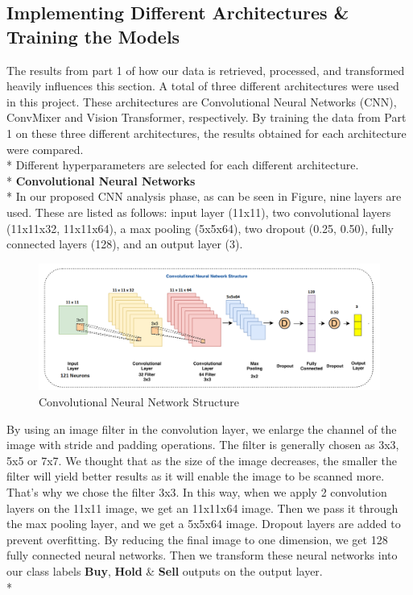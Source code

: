 \documentclass{article}
\begin{document}
\subsection{Implementing Different Architectures \& Training the Models}
The results from part 1 of how our data is retrieved, processed, and transformed heavily influences this section. A total of three different architectures were used in this project. These architectures are Convolutional Neural Networks (CNN), ConvMixer and Vision Transformer, respectively. By training the data from Part 1 on these three different architectures, the results obtained for each architecture were compared.\vspace{0.1cm} \\*
Different hyperparameters are selected for each different architecture.\vspace{0.3cm} \\*
\textbf{\large Convolutional Neural Networks} \\*
In our proposed CNN analysis phase, as can be seen in Figure, nine layers are used. These are listed as follows: input layer (11x11), two convolutional layers (11x11x32, 11x11x64), a max pooling (5x5x64), two dropout (0.25, 0.50), fully connected layers (128), and an output layer (3).
\begin{figure}[H]
\begin{center}
   \includegraphics[scale=0.24]{Assets/cnn_structure.png}
   \caption{Convolutional Neural Network Structure}
\end{center}
\end{figure}
\noindent
By using an image filter in the convolution layer, we enlarge the channel of the image with stride and padding operations. The filter is generally chosen as 3x3, 5x5 or 7x7. We thought that as the size of the image decreases, the smaller the filter will yield better results as it will enable the image to be scanned more. That's why we chose the filter 3x3. In this way, when we apply 2 convolution layers on the 11x11 image, we get an 11x11x64 image. Then we pass it through the max pooling layer, and we get a 5x5x64 image. Dropout layers are added to prevent overfitting. By reducing the final image to one dimension, we get 128 fully connected neural networks. Then we transform these neural networks into our class labels \textbf{Buy}, \textbf{Hold} \& \textbf{Sell} outputs on the output layer.\vspace{0.1cm} \\*
\end{document}
